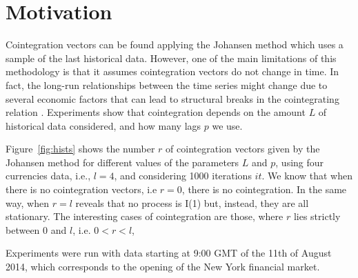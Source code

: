 \section{Motivation} \label{sec:proposal}

Cointegration vectors can be found applying the Johansen method which uses a
sample of the last historical data. However, one of the main limitations of this
methodology is that it assumes cointegration vectors do not change in time.
In fact, the long-run relationships between the time series might change due to
several economic factors that can lead to structural breaks in the cointegrating
relation \cite{gregoryETal1996}. 
Experiments show that cointegration depends on the amount $L$ of historical data
considered, and how many lags $p$ we use.

Figure~\ref{fig:hists} shows the number $r$ of cointegration vectors given by
the Johansen method for different values of the parameters $L$ and $p$, using
four currencies data, i.e., $l=4$, and considering 1000 iterations $it$.
We know that when there is no cointegration vectors, i.e $r=0$, 
there is no cointegration. In the same way, when $r=l$ reveals that no process is I(1) but,
instead, they are all stationary.
The interesting cases of cointegration are those, where $r$ lies strictly
between $0$ and $l$, i.e. $0<r<l$, 

Experiments were run with data starting at 9:00 GMT of the 11th of August 2014,
which corresponds to the opening of the New York financial market.

